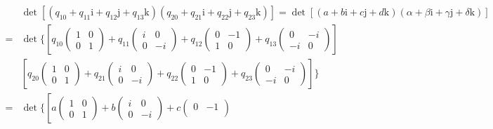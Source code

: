 \documentclass[
]{book}
\theoremstyle{definition}
\theoremstyle{definition}
\theoremstyle{definition}
\theoremstyle{definition}
\theoremstyle{remark}
\begin{document}
\[
\begin{aligned}
 & \det\left[\left(q_{{\scriptscriptstyle 10}}+q_{{\scriptscriptstyle 11}}\mathrm{i}+q_{{\scriptscriptstyle 12}}\mathrm{j}+q_{{\scriptscriptstyle 13}}\mathrm{k}\right)\left(q_{{\scriptscriptstyle 20}}+q_{{\scriptscriptstyle 21}}\mathrm{i}+q_{{\scriptscriptstyle 22}}\mathrm{j}+q_{{\scriptscriptstyle 23}}\mathrm{k}\right)\right]=\det\left[\left(a+b\mathrm{i}+c\mathrm{j}+d\mathrm{k}\right)\left(\alpha+\beta\mathrm{i}+\gamma\mathrm{j}+\delta\mathrm{k}\right)\right]\\
= & \det\Biggl\{\left[q_{{\scriptscriptstyle 10}}\begin{pmatrix}1 & 0\\
0 & 1
\end{pmatrix}+q_{{\scriptscriptstyle 11}}\begin{pmatrix}i & 0\\
0 & -i
\end{pmatrix}+q_{{\scriptscriptstyle 12}}\begin{pmatrix}0 & -1\\
1 & 0
\end{pmatrix}+q_{{\scriptscriptstyle 13}}\begin{pmatrix}0 & -i\\
-i & 0
\end{pmatrix}\right]\\
 & \left[q_{{\scriptscriptstyle 20}}\begin{pmatrix}1 & 0\\
0 & 1
\end{pmatrix}+q_{{\scriptscriptstyle 21}}\begin{pmatrix}i & 0\\
0 & -i
\end{pmatrix}+q_{{\scriptscriptstyle 22}}\begin{pmatrix}0 & -1\\
1 & 0
\end{pmatrix}+q_{{\scriptscriptstyle 23}}\begin{pmatrix}0 & -i\\
-i & 0
\end{pmatrix}\right]\Biggr\}\\
= & \det\Biggl\{\left[a\begin{pmatrix}1 & 0\\
0 & 1
\end{pmatrix}+b\begin{pmatrix}i & 0\\
0 & -i
\end{pmatrix}+c\begin{pmatrix}0 & -1\\

\end{pmatrix}
\end{aligned}\]
\end{document}
